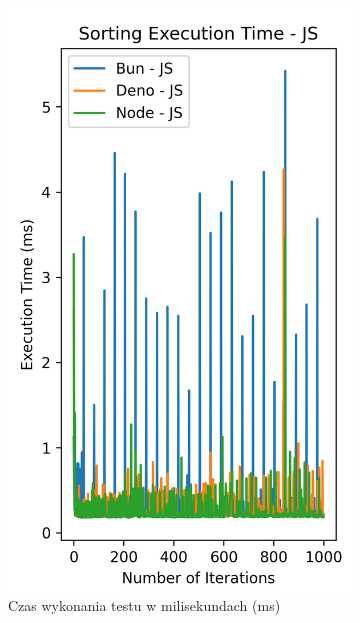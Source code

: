 \begin{figure}[H]
  \centering
  \begin{subfigure}[b]{0.4\textwidth}
    \centering
    \includegraphics[width=\textwidth]{Figures/sorting/sorting_quick_1000_1000_js_time.png}
    \caption{Czas wykonania testu w milisekundach (ms)}
    \label{fig:quick_sorting_e2_time}
  \end{subfigure}
  \begin{subfigure}[b]{0.4\textwidth}
    \centering

\end{subfigure}
\end{figure}
